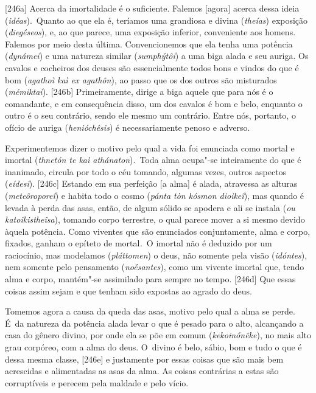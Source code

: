 [246a] Acerca da imortalidade é o suficiente. Falemos [agora]
acerca dessa ideia (\emph{idéas}).~Quanto ao que ela é, teríamos uma
grandiosa e divina (\emph{theías}) exposição (\emph{diegḗseos}), e, ao
que parece, uma exposição inferior, conveniente aos homens. Falemos por
meio desta última. Convencionemos que ela tenha uma potência
(\emph{dynámei}) e uma natureza similar (\emph{sumphýtôi}) a uma biga
alada e seu auriga. Os cavalos e cocheiros dos deuses são essencialmente
todos bons e vindos do que é bom (\emph{agathoì kaì ex agathôn}), ao
passo que os dos outros são misturados (\emph{mémiktai}). [246b]
Primeiramente, dirige a biga aquele que para nós é o comandante, e em
consequência disso, um dos cavalos é bom e belo, enquanto o outro é o seu
contrário, sendo ele mesmo um contrário. Entre nós, portanto, o ofício
de auriga (\emph{henióchêsis}) é necessariamente penoso e adverso.

Experimentemos dizer o motivo pelo qual a vida foi enunciada como mortal
e imortal (\emph{thnetón te kaì athánaton}).~Toda alma ocupa"-se
inteiramente do que é inanimado, circula por todo o céu tomando, algumas
vezes, outros aspectos (\emph{eídesi}). [246c] Estando em sua
perfeição [a alma] é alada, atravessa as alturas
(\emph{meteôroporeî}) e habita todo o cosmo (\emph{pánta tòn kósmon
dioikeî}), mas quando é levada à perda das asas, então, de algum sólido
se apodera e ali se instala (\emph{ou katoikistheîsa}), tomando corpo
terrestre, o qual parece mover a si mesmo devido àquela potência. Como
viventes que são enunciados conjuntamente, alma e corpo, fixados, ganham
o epíteto de mortal\emph{.~}O imortal não é deduzido por um raciocínio,
mas modelamos (\emph{pláttomen}) o deus, não somente pela visão
(\emph{idóntes}), nem somente pelo pensamento (\emph{noḗsantes}), como
um vivente imortal que, tendo alma e corpo, mantém"-se assimilado para
sempre no tempo. [246d] Que essas coisas assim sejam e que tenham
sido expostas ao agrado do deus.

Tomemos agora a causa da queda das asas, motivo pelo qual a alma se
perde. É~da natureza da potência alada levar o que é pesado para o alto,
alcançando a casa do gênero divino, por onde ela se põe em comum
(\emph{kekoinṓnêke}), no mais alto grau corpóreo, com a alma do deus. O~divino é belo, sábio, bom e tudo o que é dessa mesma classe, [246e]
e justamente por essas coisas que são mais bem acrescidas e alimentadas
as asas da alma. As coisas contrárias a estas são corruptíveis e perecem
pela maldade e pelo vício.

